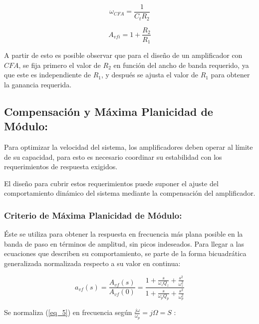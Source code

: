 \documentclass[12pt,a4paper]{article}
\begin{document}
\begin{equation}
    \label{eq_3}
    \omega_{CFA} = \frac{1}{C_tR_2}
\end{equation}
\hspace{0.5 cm}

\begin{equation}
    \label{eq_4}
A_{vfi} = 1+\frac{R_2}{R_1}
\end{equation}
\hspace{0.5 cm}

A partir de esto es posible observar que para el diseño de un amplificador con $CFA$, se fija primero el valor de $R_2$ en función del ancho de banda requerido, ya que este es independiente de $R_1$, y después se ajusta el valor de $R_1$ para obtener la ganancia requerida.
\\

\subsection{Compensación y Máxima Planicidad de Módulo:}
Para optimizar la velocidad del sistema, los amplificadores deben operar al límite de su capacidad, para esto es necesario coordinar su estabilidad con los requerimientos de respuesta exigidos. 

El diseño para cubrir estos requerimientos puede suponer el ajuste del comportamiento dinámico del sistema mediante la compensación del amplificador.
\\

\subsubsection{Criterio de Máxima Planicidad de Módulo:}

Éste se utiliza para obtener la respuesta en frecuencia más plana posible en la banda de paso en términos de amplitud, sin picos indeseados. Para llegar a las ecuaciones que describen su comportamiento, se parte de la forma bicuadrática generalizada normalizada respecto a su valor en continua:

\begin{equation}
    \label{eq_5}
    a_{vf}(s) = \frac{A_{vf}(s)}{A_{vf}(0)} = \frac{1 + \frac{s}{\omega_z Q_z} + \frac{s^2}{\omega_z^2}}{1 + \frac{s}{\omega_p Q_p} + \frac{s^2}{\omega_p^2}}
\end{equation}
\hspace{0.5 cm}

Se normaliza (\ref{eq_5}) en frecuencia según $\frac{j\omega}{\omega_p} = j\Omega =S$ :
\end{document}
